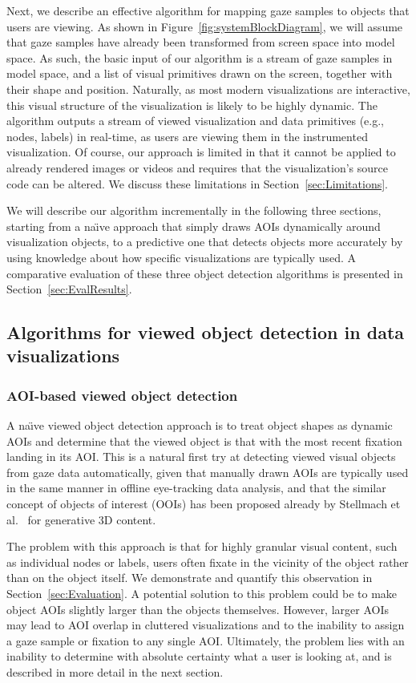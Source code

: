 Next, we describe an effective algorithm for mapping gaze samples to objects that users are viewing. As shown in Figure~\ref{fig:systemBlockDiagram}, we will assume that gaze samples have already been transformed from screen space into model space. As such, the basic input of our algorithm is a stream of gaze samples in model space, and a list of visual primitives drawn on the screen, together with their shape and position. Naturally, as most modern visualizations are interactive, this visual structure of the visualization is likely to be highly dynamic. The algorithm outputs a stream of viewed visualization and data primitives (e.g., nodes, labels) in real-time, as users are viewing them in the instrumented visualization. Of course, our approach is limited in that it cannot be applied to already rendered images or videos and requires that the visualization's source code can be altered. We discuss these limitations in Section~\ref{sec:Limitations}.

We will describe our algorithm incrementally in the following three sections, starting from a na\"{\i}ve approach that simply draws AOIs dynamically around visualization objects, to a predictive one that detects objects more accurately by using knowledge about how specific visualizations are typically used.  A comparative evaluation of these three object detection algorithms is presented in Section~\ref{sec:EvalResults}.

\subsection{Algorithms for viewed object detection in data visualizations}
\label{sec:MethodsAlgorithmsViewedObjectDetection}
\subsubsection{AOI-based viewed object detection}
\label{sec:AOIBasedViewedObjectDetection}
A na\"{\i}ve viewed object detection approach is to treat object shapes as dynamic AOIs and determine that the viewed object is that with the most recent fixation landing in its AOI. This is a natural first try at detecting viewed visual objects from gaze data automatically, given that manually drawn AOIs are typically used in the same manner in offline eye-tracking data analysis, and that the similar concept of objects of interest (OOIs) has been proposed already by Stellmach et al.~\cite{stellmach20103d} for generative 3D content.

The problem with this approach is that for highly granular visual content, such as individual nodes or labels, users often fixate in the vicinity of the object rather than on the object itself. We demonstrate and quantify this observation in Section~\ref{sec:Evaluation}. A potential solution to this problem could be to make object AOIs slightly larger than the objects themselves. However, larger AOIs may lead to AOI overlap in cluttered visualizations and to the inability to assign a gaze sample or fixation to any single AOI. Ultimately, the problem lies with an inability to determine with absolute certainty what a user is looking at, and is described in more detail in the next section.

